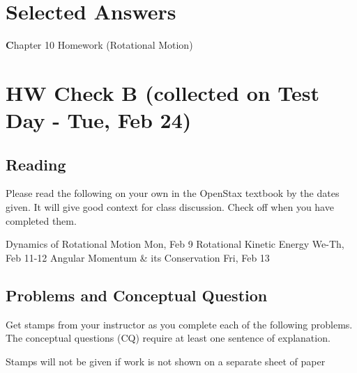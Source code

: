 \documentclass[10pt]{exam}
\def\theanswers{\theendnotes}
\def\testday{Tue, Feb 24}
\def\four{Mon, Feb 9}
\def\five{We-Th, Feb 11-12}
\def\six{Fri, Feb 13}
\def\mytitle{Chapter 10 Homework (Rotational Motion)}
\def\mymaketitle{
  \begin{flushleft}
    {\LARGE \textbf \mytitle \par}
  \end{flushleft}
}
\begin{document}
\pagebreak

\newcommand{\refsheet}{
  \section*{Selected Answers}

  \renewcommand{\enotesize}{\normalsize}
  \renewcommand{\enoteformat}{%
    \leftskip=1.8em
    \makebox[0pt][r]{\theenmark. }%
  }

  \hfill
  \theanswers
}

\refsheet



\pagebreak
\mymaketitle
\section*{HW Check B (collected on Test Day - \testday)}







\subsection*{Reading}

Please read the following on your own in the OpenStax textbook by the dates given.  It will give good context for class discussion.  Check off when you have completed them.

\vspace{1em}

\begin{checkboxes}
   Dynamics of Rotational Motion \dotfill \four
   Rotational Kinetic Energy \dotfill \five
   Angular Momentum \& its Conservation \dotfill \six
\end{checkboxes}


\subsection*{Problems and Conceptual Question}


Get stamps from your instructor as you complete each of the following problems.  The conceptual questions (CQ) require at least one sentence of explanation.

\vspace{1em}

\noindent
{\sc Stamps will not be given if work is not shown on a separate sheet of paper}
\end{document}
